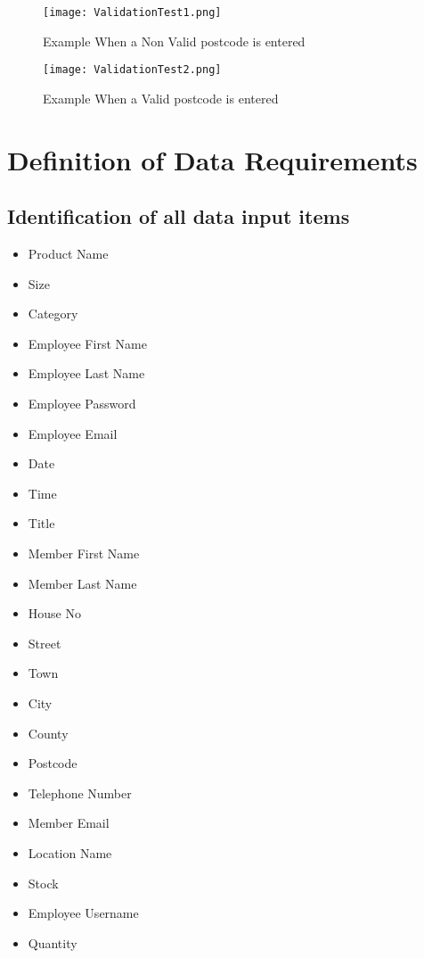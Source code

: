 \begin{figure}[H]
\caption{Example When a Non Valid postcode is entered} \label{fig:Example When a Non Valid postcode is entered }
\hfill\texttt{[image: ValidationTest1.png]}\hspace*{\fill}
\end{figure}

\begin{figure}[H]
\caption{Example When a Valid postcode is entered} \label{fig:Example When a Valid postcode is entered}
\hfill\texttt{[image: ValidationTest2.png]}\hspace*{\fill}
\end{figure}

\pagebreak

\section{Definition of Data Requirements}

\subsection{Identification of all data input items}

\begin{itemize}
\item Product Name
\item Size
\item Category
\item Employee First Name
\item Employee Last Name
\item Employee Password
\item Employee Email
\item Date
\item Time
\item Title
\item Member First Name
\item Member Last Name
\item House No
\item Street
\item Town
\item City
\item County
\item Postcode
\item Telephone Number
\item Member Email
\item Location Name
\item Stock
\item Employee Username
\item Quantity
\end{itemize}

